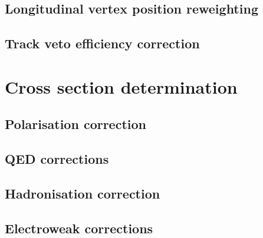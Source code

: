 

 \section{Longitudinal vertex position reweighting}
 
 
 \section{Track veto efficiency correction}
 
 
 \chapter{Cross section determination}
 
 
 \section{Polarisation correction}
 
 
 \section{QED corrections}
 
 \section{Hadronisation correction}
 
 \section{Electroweak corrections}
 
 
% 

\newpage

